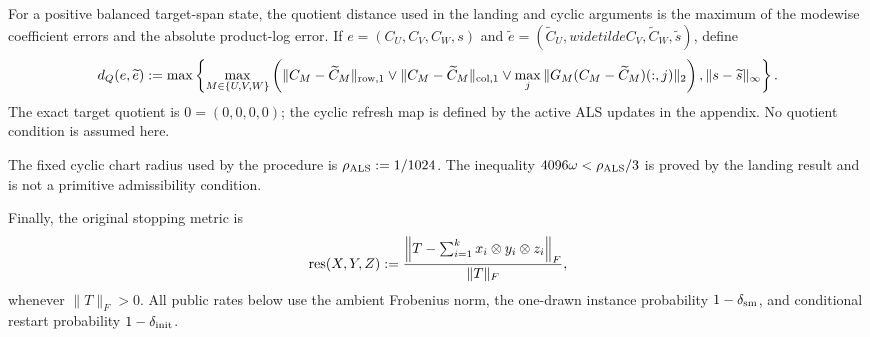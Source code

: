 For a positive balanced target-span state, the quotient distance used in the
landing and cyclic arguments is the maximum of the modewise coefficient
errors and the absolute product-log error.  If
$e=(C_U,C_V,C_W,s)$ and $\widetilde e=(\widetilde C_U,widetilde C_V,
\widetilde C_W,\widetilde s)$, define
\[
d_Q(e,\widetilde e):=\max\left\{
\max_{M\in\{U,V,W\}}\left(
\|C_M-\widetilde C_M\|_{\rm row,1}\vee
\|C_M-\widetilde C_M\|_{\rm col,1}\vee
\max_j\|G_M(C_M-\widetilde C_M)(:,j)\|_2\right),
\|s-\widetilde s\|_\infty\right\}.
\]
The exact target quotient is $0=(0,0,0,0)$; the cyclic refresh map is
defined by the active ALS updates in the appendix.  No quotient condition is
assumed here.

The fixed cyclic chart radius used by the procedure is
$\rho_{\rm ALS}:=1/1024$.  The inequality
$4096\omega<\rho_{\rm ALS}/3$ is proved by the landing result and is not a
primitive admissibility condition.

Finally, the original stopping metric is
\[
 \operatorname{res}(X,Y,Z):=
 {\left\|T-\sum_{i=1}^k x_i\otimes y_i\otimes z_i\right\|_F\over\|T\|_F},
\]
whenever $\|T\|_F>0$.  All public rates below use the ambient Frobenius norm,
the one-drawn instance probability $1-\delta_{\rm sm}$, and conditional
restart probability $1-\delta_{\rm init}$.

